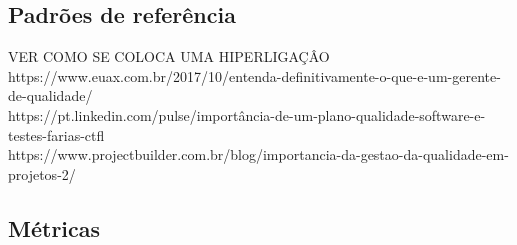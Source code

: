 \subsection{Padrões de referência}
VER COMO SE COLOCA UMA HIPERLIGAÇÂO
https://www.euax.com.br/2017/10/entenda-definitivamente-o-que-e-um-gerente-de-qualidade/ \\
https://pt.linkedin.com/pulse/importância-de-um-plano-qualidade-software-e-testes-farias-ctfl \\
https://www.projectbuilder.com.br/blog/importancia-da-gestao-da-qualidade-em-projetos-2/ 
\subsection{Métricas}